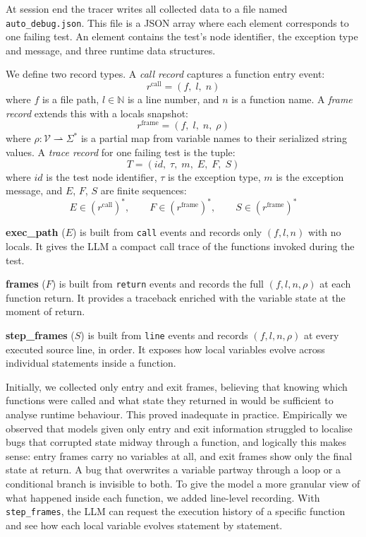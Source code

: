 At session end the tracer writes all collected data to a file named \texttt{auto\_debug.json}. This file is a JSON array where each element corresponds to one failing test. An element contains the test's node identifier, the exception type and message, and three runtime data structures.

We define two record types. A \emph{call record} captures a function entry event:
\[
  r^{\mathrm{call}} = (f,\; l,\; n)
\]
where $f$ is a file path, $l \in \mathbb{N}$ is a line number, and $n$ is a function name. A \emph{frame record} extends this with a locals snapshot:
\[
  r^{\mathrm{frame}} = (f,\; l,\; n,\; \rho)
\]
where $\rho : \mathcal{V} \rightharpoonup \Sigma^{*}$ is a partial map from variable names to their serialized string values. A \emph{trace record} for one failing test is the tuple:
\[
  T = (\mathit{id},\; \tau,\; m,\; E,\; F,\; S)
\]
where $\mathit{id}$ is the test node identifier, $\tau$ is the exception type, $m$ is the exception message, and $E$, $F$, $S$ are finite sequences:
\[
  E \in (r^{\mathrm{call}})^{*}, \qquad F \in (r^{\mathrm{frame}})^{*}, \qquad S \in (r^{\mathrm{frame}})^{*}
\]

\textbf{exec\_path} ($E$) is built from \texttt{call} events and records only $(f, l, n)$ with no locals. It gives the LLM a compact call trace of the functions invoked during the test.

\textbf{frames} ($F$) is built from \texttt{return} events and records the full $(f, l, n, \rho)$ at each function return. It provides a traceback enriched with the variable state at the moment of return.

\textbf{step\_frames} ($S$) is built from \texttt{line} events and records $(f, l, n, \rho)$ at every executed source line, in order. It exposes how local variables evolve across individual statements inside a function.

Initially, we collected only entry and exit frames, believing that knowing which functions were called and what state they returned in would be sufficient to analyse runtime behaviour. This proved inadequate in practice. Empirically we observed that models given only entry and exit information struggled to localise bugs that corrupted state midway through a function, and logically this makes sense: entry frames carry no variables at all, and exit frames show only the final state at return. A bug that overwrites a variable partway through a loop or a conditional branch is invisible to both. To give the model a more granular view of what happened inside each function, we added line-level recording. With \texttt{step\_frames}, the LLM can request the execution history of a specific function and see how each local variable evolves statement by statement.

